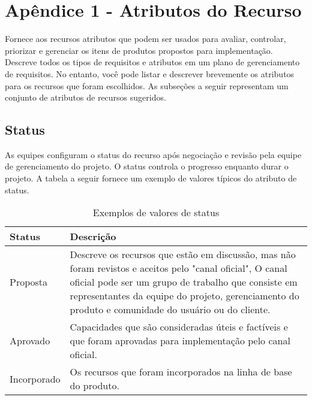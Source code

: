 \documentclass{report}
\begin{document}
\chapter{Apêndice 1 - Atributos do Recurso}

Fornece aos recursos atributos que podem ser usados para avaliar, controlar,
priorizar e gerenciar os itens de produtos propostos para implementação.
Descreve todos os tipos de requisitos e atributos em um plano de gerenciamento
de requisitos. No entanto, você pode listar e descrever brevemente os atributos
para os recursos que foram escolhidos. As subseções a seguir representam um
conjunto de atributos de recursos sugeridos.

\section{Status}

As equipes configuram o status do recurso após negociação e revisão pela equipe
de gerenciamento do projeto. O status controla o progresso enquanto durar o
projeto. A tabela a seguir fornece um exemplo de valores típicos do atributo de
status.

\begin{table}[H]
	\centering

	\begin{tabularx}{\textwidth}{X|X}
		\textbf{Status} & \textbf{Descrição}                                                                                                                                                                                                                                                     \\
		\hline
		Proposta        & Descreve os recursos que estão em discussão, mas não foram revistos e aceitos pelo "canal oficial", O canal oficial pode ser um grupo de trabalho que consiste em representantes da equipe do projeto, gerenciamento do produto e comunidade do usuário ou do cliente. \\
		Aprovado        & Capacidades que são consideradas úteis e factíveis e que foram aprovadas para implementação pelo canal oficial.                                                                                                                                                        \\
		Incorporado     & Os recursos que foram incorporados na linha de base do produto.                                                                                                                                                                                                        \\
		\hline
	\end{tabularx}

	\caption[Valores de status]{Exemplos de valores de status}
	\label{tab:status}
\end{table}
\end{document}
